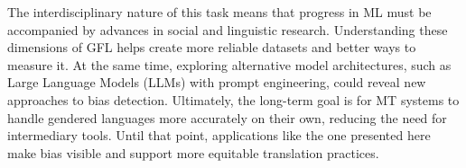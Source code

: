    The interdisciplinary nature of this task means that progress in ML must be accompanied by advances in social and linguistic research. Understanding these dimensions of GFL helps create more reliable datasets and better ways to measure it. At the same time, exploring alternative model architectures, such as Large Language Models (LLMs) with prompt engineering, could reveal new approaches to bias detection. Ultimately, the long-term goal is for MT systems to handle gendered languages more accurately on their own, reducing the need for intermediary tools. Until that point, applications like the one presented here make bias visible and support more equitable translation practices.
